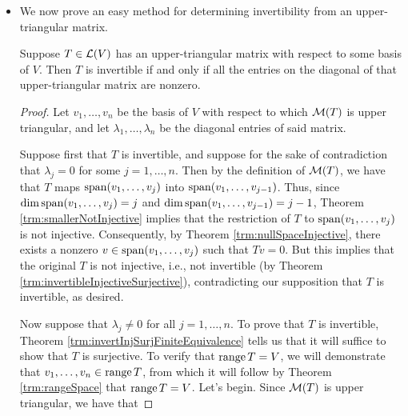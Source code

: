 \documentclass[../main.tex]{subfiles}
\begin{document}
\begin{itemize}
\begin{theorem}
\begin{proof}
            \begin{equation*}
                (T/U)(v_j+U) \in \spn(v_2+U,\dots,v_j+U)
            \end{equation*}
            for each $j=2,\dots,n$. Thus, since $Tv_1=\lambda v_1\in\spn(v_1)$ and since the above implies that $Tv_j\in\spn(v_2,\dots,v_j)\subset\spn(v_1,\dots,v_j)$ for all $j=2,\dots,n$, we have that $Tv_j\in\spn(v_1,\dots,v_j)$ for all $j=1,\dots,n$. Therefore, by Theorem \ref{trm:upperTriangularConditions}, we have that the matrix of $T$ with respect to $v_1,\dots,v_n$ is upper triangular, as desired.
        \end{proof}
    \end{theorem}
    \item We now prove an easy method for determining invertibility from an upper-triangular matrix.
    \begin{theorem}\label{trm:upperTriangularInvertible}
        Suppose $T\in\mathcal{L}(V)$ has an upper-triangular matrix with respect to some basis of $V$. Then $T$ is invertible if and only if all the entries on the diagonal of that upper-triangular matrix are nonzero.
        \begin{proof}
            Let $v_1,\dots,v_n$ be the basis of $V$ with respect to which $\mathcal{M}(T)$ is upper triangular, and let $\lambda_1,\dots,\lambda_n$ be the diagonal entries of said matrix.\par
            Suppose first that $T$ is invertible, and suppose for the sake of contradiction that $\lambda_j=0$ for some $j=1,\dots,n$. Then by the definition of $\mathcal{M}(T)$, we have that $T$ maps $\operatorname{span}(v_1,\dots,v_j)$ into $\operatorname{span}(v_1,\dots,v_{j-1})$. Thus, since $\dim\operatorname{span}(v_1,\dots,v_j)=j$ and $\dim\operatorname{span}(v_1,\dots,v_{j-1})=j-1$, Theorem \ref{trm:smallerNotInjective} implies that the restriction of $T$ to $\operatorname{span}(v_1,\dots,v_j)$ is not injective. Consequently, by Theorem \ref{trm:nullSpaceInjective}, there exists a nonzero $v\in\operatorname{span}(v_1,\dots,v_j)$ such that $Tv=0$. But this implies that the original $T$ is not injective, i.e., not invertible (by Theorem \ref{trm:invertibleInjectiveSurjective}), contradicting our supposition that $T$ is invertible, as desired.\par
            Now suppose that $\lambda_j\neq 0$ for all $j=1,\dots,n$. To prove that $T$ is invertible, Theorem \ref{trm:invertInjSurjFiniteEquivalence} tells us that it will suffice to show that $T$ is surjective. To verify that $\operatorname{range} T=V$, we will demonstrate that $v_1,\dots,v_n\in\operatorname{range} T$, from which it will follow by Theorem \ref{trm:rangeSpace} that $\operatorname{range} T=V$. Let's begin. Since $\mathcal{M}(T)$ is upper triangular, we have that

\end{proof}
\end{theorem}
\end{itemize}
\end{document}
